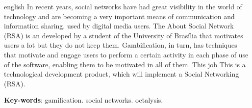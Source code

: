 \begin{resumo}[Abstract]
 \begin{otherlanguage*}{english}
     In recent years, social networks have had great visibility in the world of technology
     and are becoming a very important means of communication and information sharing.
     used by digital media users. The About Social Network (RSA) is an
     developed by a student of the University of Brasília that motivates users a lot
     but they do not keep them. Gambification, in turn, has techniques
     that motivate and engage users to perform a certain activity in each phase of
     use of the software, enabling them to be motivated in all of them. This job
     This is a technological development product, which will implement a
     Social Networking (RSA).


   \vspace{\onelineskip}
 
   \noindent 
   \textbf{Key-words}: gamification. social networks. octalysis.
 \end{otherlanguage*}
\end{resumo}
